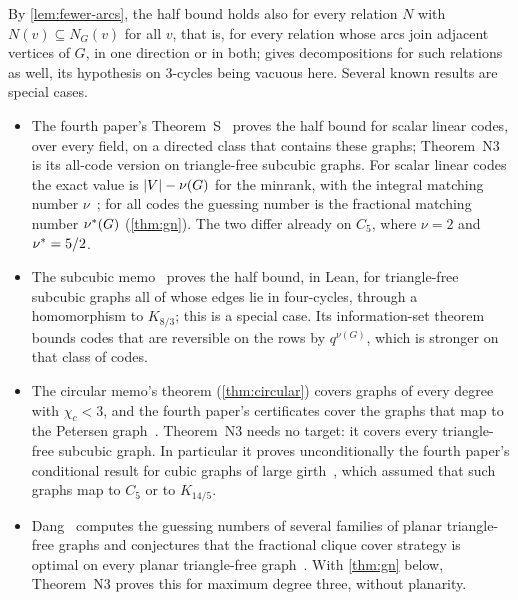 By \cref{lem:fewer-arcs}, the half bound holds also for every relation $N$ with $N(v)\subseteq N_G(v)$ for all $v$,
that is, for every relation whose arcs join adjacent vertices of $G$, in one direction or in both;
 gives decompositions for such relations as well, its hypothesis on $3$-cycles being vacuous here.
Several known results are special cases.
\begin{itemize}[leftmargin=2em]
\item The fourth paper's Theorem~S~\cite[Theorem~6.13]{FourthPaper2026} proves the half bound for scalar linear codes,
over every field, on a directed class that contains these graphs; Theorem~N3 is its all-code version on triangle-free
subcubic graphs. For scalar linear codes the exact value is $\lvert V \rvert-\nu(G)$ for the minrank, with the integral matching
number $\nu$~\cite[Theorem~6.16]{FourthPaper2026}; for all codes the guessing number is the fractional matching number
$\nu^{*}(G)$ (\cref{thm:gn}). The two differ already on $C_5$, where $\nu=2$ and $\nu^{*}=5/2$.
\item The subcubic memo~\cite[Theorem~7.1]{SubcubicMemo2026} proves the half bound, in Lean, for triangle-free subcubic
graphs all of whose edges lie in four-cycles, through a homomorphism to $K_{8/3}$; this is a special case. Its
information-set theorem~\cite[Theorem~2.3]{SubcubicMemo2026} bounds codes that are reversible on the rows by
$q^{\nu(G)}$, which is stronger on that class of codes.
\item The circular memo's theorem (\cref{thm:circular}) covers graphs of every degree with $\chi_c<3$, and the fourth
paper's certificates cover the graphs that map to the Petersen graph~\cite[Corollary~6.9]{FourthPaper2026}. Theorem~N3
needs no target: it covers every triangle-free subcubic graph. In particular it proves unconditionally the fourth paper's
conditional result for cubic graphs of large girth~\cite[Corollary~6.10]{FourthPaper2026}, which assumed that such graphs
map to $C_5$ or to $K_{14/5}$.
\item Dang~\cite{Dang2015} computes the guessing numbers of several families of planar triangle-free graphs and
conjectures that the fractional clique cover strategy is optimal on every planar triangle-free
graph~\cite[Conjecture~15]{Dang2015}. With \cref{thm:gn} below, Theorem~N3 proves this for maximum degree three,
without planarity.
\end{itemize}

